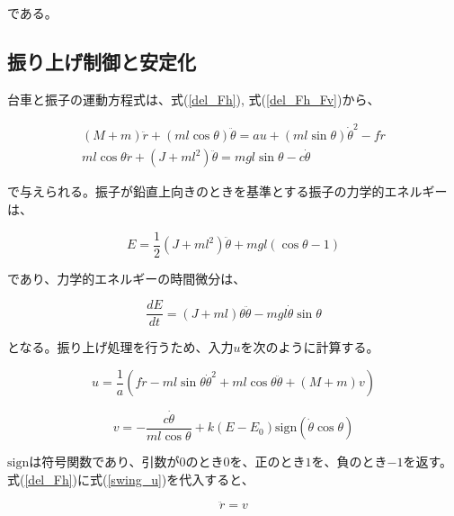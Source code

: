 である。

\subsection{振り上げ制御と安定化}
台車と振子の運動方程式は、式(\ref{del_Fh}), 式(\ref{del_Fh_Fv})から、

$$
    \begin{array}{c}
        (M + m) \ddot{r} + (ml\cos{\theta}) \ddot{\theta} 
            = au + (ml\sin{\theta}) \dot{\theta}^2 - f \dot{r} \\
        ml\cos{\theta} \ddot{r} + (J + ml^2) \ddot{\theta} 
            = mgl\sin{\theta} -c \dot{\theta}
    \end{array}
$$

で与えられる。振子が鉛直上向きのときを基準とする振子の力学的エネルギーは、

\begin{equation}
    E = \frac{1}{2} \left( J + ml^2 \right) \ddot{\theta}
        + mgl \left( \cos{\theta} - 1 \right)
\end{equation}

であり、力学的エネルギーの時間微分は、

\begin{equation}
    \frac{dE}{dt} = (J + ml) \theta \ddot{\theta}
                    - mgl \dot{\theta} \sin{\theta}
    \label{dEdt}
\end{equation}

となる。振り上げ処理を行うため、入力$u$を次のように計算する。

\begin{equation}
    u = \frac{1}{a}
        \left(
            f \dot{r} - ml \sin{\theta} \dot{\theta}^2 + ml \cos{\theta} \ddot{\theta}
            + (M + m)v
        \right)
    \label{swing_u}
\end{equation}

\begin{equation}
    v = - \frac{c \dot{\theta}}{ml\cos{\theta}} 
        + k(E - E_{0}) \mbox{sign}(\dot{\theta}\cos{\theta})
    \label{swing_v}
\end{equation}

$\mbox{sign}$は符号関数であり、引数が$0$のとき$0$を、正のとき$1$を、負のとき$-1$を返す。
式(\ref{del_Fh})に式(\ref{swing_u})を代入すると、

\begin{equation}
    \ddot{r} = v
    \label{ddot_r}
\end{equation}

